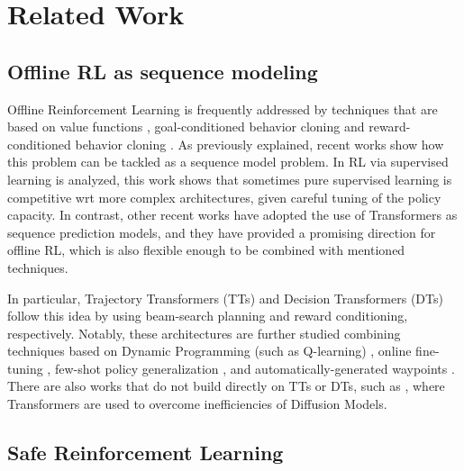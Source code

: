 \section{Related Work}
 
\subsection{Offline RL as sequence modeling}

Offline Reinforcement Learning \cite{offline_rl_survey} is frequently addressed by techniques that are based on value functions \cite{kumar2020conservative,kostrikov2021offline}, goal-conditioned behavior cloning \cite{nair2018visual,ding2019goal} and reward-conditioned behavior cloning \cite{kumar2019reward,srivastava2019training}.
As previously explained, recent works show how this problem can be tackled as a sequence model problem. In \cite{emmons2021rvs} RL via supervised learning is analyzed, this work shows that sometimes pure supervised learning is competitive wrt more complex architectures, given careful tuning of the policy capacity. In contrast, other recent works have adopted the use of Transformers \cite{transformers} as sequence prediction models, and they have provided a promising direction for offline RL, which is also flexible enough to be combined with mentioned techniques. 

In particular, Trajectory Transformers (TTs) \cite{trajectory_transformers} and Decision Transformers (DTs) \cite{decision_transformers} follow this idea by using beam-search planning and reward conditioning, respectively. Notably, these architectures are further studied combining techniques based on Dynamic Programming (such as Q-learning) \cite{yamagata2023q}, online fine-tuning \cite{zheng2022online}, few-shot policy generalization \cite{xu2022prompting}, and automatically-generated waypoints \cite{badrinath2023waypoint}. There are also works that do not build directly on TTs or DTs, such as \cite{huang2024diffusion}, where Transformers are used to overcome inefficiencies of Diffusion Models.

\subsection{Safe Reinforcement Learning}


